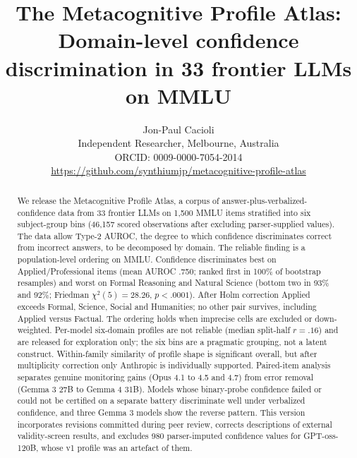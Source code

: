 \documentclass{article}
\title{The Metacognitive Profile Atlas: \\
       Domain-level confidence discrimination in 33 frontier LLMs on MMLU}
\author{%
  Jon-Paul Cacioli \\
  Independent Researcher, Melbourne, Australia \\
  ORCID: 0009-0000-7054-2014 \\
  \url{https://github.com/synthiumjp/metacognitive-profile-atlas}
}
\begin{document}
\maketitle

\begin{abstract}
We release the Metacognitive Profile Atlas, a corpus of answer-plus-verbalized-confidence data from 33 frontier LLMs on 1{,}500 MMLU items stratified into six subject-group bins (46{,}157 scored observations after excluding parser-supplied values). The data allow Type-2 AUROC, the degree to which confidence discriminates correct from incorrect answers, to be decomposed by domain. The reliable finding is a population-level ordering on MMLU. Confidence discriminates best on Applied/Professional items (mean AUROC .750; ranked first in 100\% of bootstrap resamples) and worst on Formal Reasoning and Natural Science (bottom two in 93\% and 92\%; Friedman $\chi^2(5) = 28.26$, $p < .0001$). After Holm correction Applied exceeds Formal, Science, Social and Humanities; no other pair survives, including Applied versus Factual. The ordering holds when imprecise cells are excluded or down-weighted. Per-model six-domain profiles are not reliable (median split-half $r = .16$) and are released for exploration only; the six bins are a pragmatic grouping, not a latent construct. Within-family similarity of profile shape is significant overall, but after multiplicity correction only Anthropic is individually supported. Paired-item analysis separates genuine monitoring gains (Opus 4.1 to 4.5 and 4.7) from error removal (Gemma 3 27B to Gemma 4 31B). Models whose binary-probe confidence failed or could not be certified on a separate battery discriminate well under verbalized confidence, and three Gemma 3 models show the reverse pattern. This version incorporates revisions committed during peer review, corrects descriptions of external validity-screen results, and excludes 980 parser-imputed confidence values for GPT-oss-120B, whose v1 profile was an artefact of them.
\end{abstract}
\end{document}
